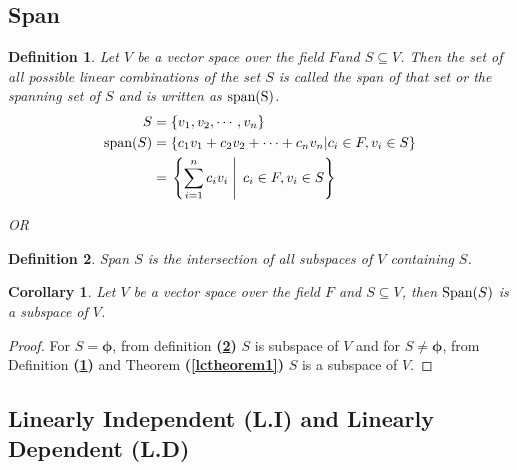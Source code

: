 \documentclass[a4paper, titlepage]{article}
\newtheorem{definition}{Definition}[section]
\newtheorem{corollary}{Corollary}[theorem]
\begin{document}
    \subsection{Span}
    \begin{definition}
        \label{span1}
        Let $V$ be a vector space over the field $F$and $S \subseteq V$.
        Then the set of all possible linear combinations of the set
        $S$ is called the span of that set or the spanning set of $S$ 
        and is written as $\textup{span(S)}$.
        \begin{align*}
            S &= \{ v_1, v_2, \cdots, v_n \} \\
            \textup{span}(S) &= \{ c_1v_1 + c_2v_2 + \cdots + c_nv_n \vert c_i \in F, v_i \in S \} \\
                           &= \left. \left\{ \displaystyle\sum_{i=1}^n c_iv_i \; \right\vert \; c_i \in F, v_i \in S \right\}
        \end{align*}
        \begin{center}
            OR
        \end{center}
    \end{definition}
    \begin{definition}
        \label{span2}
        Span $S$ is the intersection of all subspaces of $V$
        containing $S$.
    \end{definition}
    \begin{corollary}
        Let $V$ be a vector space over the field $F$ and 
        $S \subseteq V$, then$\textup{ Span}(S)$ is a subspace of $V$.
    \end{corollary}
    \begin{proof}
        For $S = \bm{\phi}$, from definition \textbf{(\ref{span2})} 
        $S$ is subspace of $V$ and for $S \neq \bm{\phi}$, from
        Definition \textbf{(\ref{span1})} and Theorem \textbf{(\ref{lctheorem1})}
        $S$ is a subspace of $V$.
    \end{proof}
    
    \subsection{Linearly Independent (L.I) and Linearly Dependent (L.D)}
\end{document}
